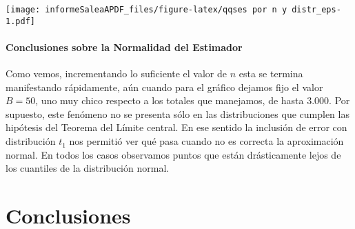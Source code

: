 \documentclass[]{article}
\newenvironment{Shaded}{\begin{snugshade}}{\end{snugshade}}
\newcommand{\DataTypeTok}[1]{\textcolor[rgb]{0.13,0.29,0.53}{#1}}
\newcommand{\DecValTok}[1]{\textcolor[rgb]{0.00,0.00,0.81}{#1}}
\newcommand{\KeywordTok}[1]{\textcolor[rgb]{0.13,0.29,0.53}{\textbf{#1}}}
\newcommand{\NormalTok}[1]{#1}
\newcommand{\OperatorTok}[1]{\textcolor[rgb]{0.81,0.36,0.00}{\textbf{#1}}}
\newcommand{\StringTok}[1]{\textcolor[rgb]{0.31,0.60,0.02}{#1}}
\let\oldparagraph\paragraph
\renewcommand{\paragraph}[1]{\oldparagraph{#1}\mbox{}}
\begin{document}
\begin{Shaded}
\end{Shaded}

\texttt{[image: informeSaleaAPDF\_files/figure-latex/qqses por n y distr\_eps-1.pdf]}

\hypertarget{conclusiones-sobre-la-normalidad-del-estimador}{%
\paragraph{Conclusiones sobre la Normalidad del
Estimador}\label{conclusiones-sobre-la-normalidad-del-estimador}}

Como vemos, incrementando lo suficiente el valor de \(n\) esta se
termina manifestando rápidamente, aún cuando para el gráfico dejamos
fijo el valor \(B=50\), uno muy chico respecto a los totales que
manejamos, de hasta 3.000. Por supuesto, este fenómeno no se presenta
sólo en las distribuciones que cumplen las hipótesis del Teorema del
Límite central. En ese sentido la inclusión de error con distribución
\(t_1\) nos permitió ver qué pasa cuando no es correcta la aproximación
normal. En todos los casos observamos puntos que están drásticamente
lejos de los cuantiles de la distribución normal.

\hypertarget{conclusiones}{%
\section{Conclusiones}\label{conclusiones}}
\end{document}
